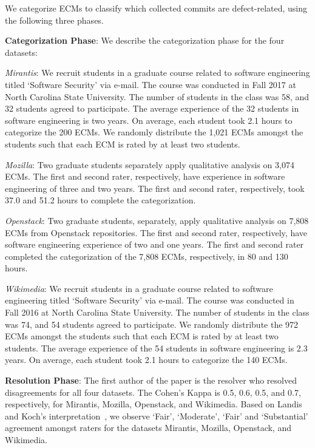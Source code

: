 \documentclass[smallextended]{svjour3}       %
\begin{document}
We categorize ECMs to classify which collected commits are defect-related, using the following three phases.  

\textbf{Categorization Phase}: We describe the categorization phase for the four datasets: 

\textit{Mirantis}: We recruit students in a graduate course related to software engineering titled `Software Security' via e-mail. The course was conducted in Fall 2017 at North Carolina State University. The number of students in the class was 58, and 32 students agreed to participate. The average experience of the 32 students in software engineering is two years. On average, each student took 2.1 hours to categorize the 200 ECMs. We randomly distribute the 1,021 ECMs amongst the students such that each ECM is rated by at least two students. 

\textit{Mozilla}: Two graduate students separately apply qualitative analysis on 3,074 ECMs. The first and second rater, respectively, have experience in software engineering of three and two years. The first and second rater, respectively, took 37.0 and 51.2 hours to complete the categorization.

\textit{Openstack}: Two graduate students, separately, apply qualitative analysis on 7,808 ECMs from Openstack repositories. The first and second rater, respectively, have software engineering experience of two and one years. The first and second rater completed the categorization of the 7,808 ECMs, respectively, in 80 and 130 hours.

\textit{Wikimedia}: We recruit students in a graduate course related to software engineering titled `Software Security' via e-mail. The course was conducted in Fall 2016 at North Carolina State University. The number of students in the class was 74, and 54 students agreed to participate. We randomly distribute the 972 ECMs amongst the students such that each ECM is rated by at least two students. The average experience of the 54 students in software engineering is 2.3 years. On average, each student took 2.1 hours to categorize the 140 ECMs.

\textbf{Resolution Phase}: The first author of the paper is the resolver who resolved disagreements for all four datasets. The Cohen's Kappa is 0.5, 0.6, 0.5, and 0.7, respectively, for Mirantis, Mozilla, Openstack, and Wikimedia. Based on Landis and Koch's interpretation~\citep{Landis:Koch:Kappa:Range}, we observe `Fair', `Moderate', `Fair' and `Substantial' agreement amongst raters for the datasets Mirantis, Mozilla, Openstack, and Wikimedia. 
\end{document}
